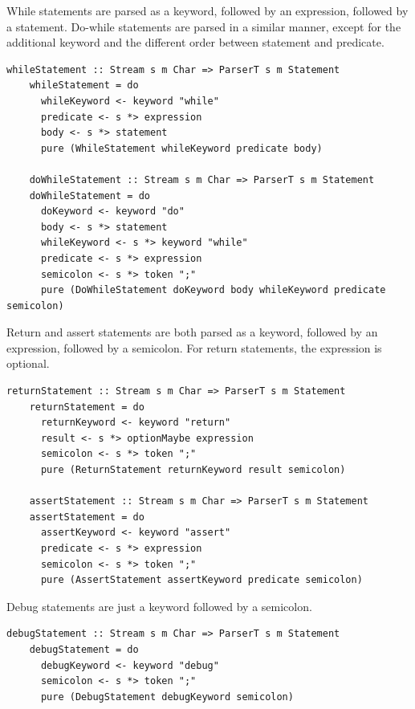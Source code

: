 \documentclass[UdineBachThesis,american,11pt]{PhdThesis}
\begin{document}
  \pagebreak

  While statements are parsed as a \lstinline@while@ keyword, followed by an
  expression, followed by a statement. Do-while statements are parsed in a
  similar manner, except for the additional \lstinline@do@ keyword and the
  different order between statement and predicate.

  \begin{lstlisting}[gobble=4,basicstyle=\ttfamily\small]
    whileStatement :: Stream s m Char => ParserT s m Statement
    whileStatement = do
      whileKeyword <- keyword "while"
      predicate <- s *> expression
      body <- s *> statement
      pure (WhileStatement whileKeyword predicate body)

    doWhileStatement :: Stream s m Char => ParserT s m Statement
    doWhileStatement = do
      doKeyword <- keyword "do"
      body <- s *> statement
      whileKeyword <- s *> keyword "while"
      predicate <- s *> expression
      semicolon <- s *> token ";"
      pure (DoWhileStatement doKeyword body whileKeyword predicate semicolon)
  \end{lstlisting}

  Return and assert statements are both parsed as a keyword, followed by an
  expression, followed by a semicolon. For return statements, the expression is
  optional.

  \begin{lstlisting}[gobble=4,basicstyle=\ttfamily\small]
    returnStatement :: Stream s m Char => ParserT s m Statement
    returnStatement = do
      returnKeyword <- keyword "return"
      result <- s *> optionMaybe expression
      semicolon <- s *> token ";"
      pure (ReturnStatement returnKeyword result semicolon)

    assertStatement :: Stream s m Char => ParserT s m Statement
    assertStatement = do
      assertKeyword <- keyword "assert"
      predicate <- s *> expression
      semicolon <- s *> token ";"
      pure (AssertStatement assertKeyword predicate semicolon)
  \end{lstlisting}

  Debug statements are just a \lstinline@debug@ keyword followed by a semicolon.

  \begin{lstlisting}[gobble=4,basicstyle=\ttfamily\small]
    debugStatement :: Stream s m Char => ParserT s m Statement
    debugStatement = do
      debugKeyword <- keyword "debug"
      semicolon <- s *> token ";"
      pure (DebugStatement debugKeyword semicolon)
  \end{lstlisting}
\end{document}

